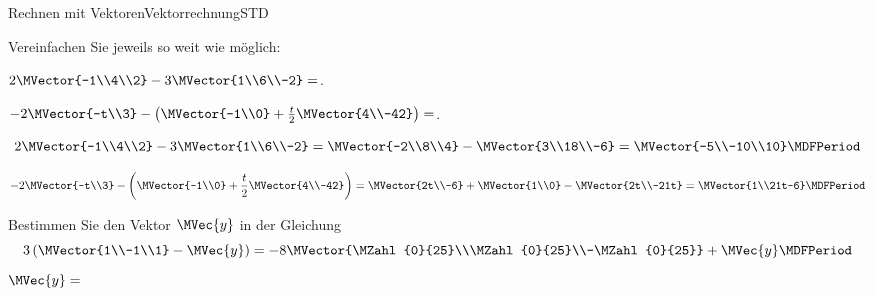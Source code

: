 \begin{MXContent}{Rechnen mit Vektoren}{Vektorrechnung}{STD}
\begin{MExercise}
\end{MExercise}

\begin{MExercise}
Vereinfachen Sie jeweils so weit wie möglich:
\begin{MExerciseItems}
\item{$2\MVector{-1\\4\\2}-3\MVector{1\\6\\-2}=$.} 
\item{$-2\MVector{-t\\3}-\left(\MVector{-1\\0}+\frac{t}{2}\MVector{4\\-42}\right)=$.}
\end{MExerciseItems}
\end{MExercise}

\begin{MHint}{\iSolution}
\begin{MExerciseItems}
\item{
\[
 2\MVector{-1\\4\\2}-3\MVector{1\\6\\-2}=\MVector{-2\\8\\4}-\MVector{3\\18\\-6}=\MVector{-5\\-10\\10} \MDFPeriod
\]
} 
\item{
\[
 -2\MVector{-t\\3}-\left(\MVector{-1\\0}+\frac{t}{2}\MVector{4\\-42}\right)=\MVector{2t\\-6}+\MVector{1\\0}-\MVector{2t\\-21t}=\MVector{1\\21t-6} \MDFPeriod
\]

}
\end{MExerciseItems}
 
\end{MHint}

\begin{MExercise}
Bestimmen Sie den Vektor $\MVec{y}$ in der Gleichung
\[
 3\left(\MVector{1\\-1\\1}-\MVec{y}\right)=-8\MVector{\MZahl{0}{25}\\\MZahl{0}{25}\\-\MZahl{0}{25}}+\MVec{y} \MDFPeriod
\]
$\MVec{y}=$
\end{MExercise}


\end{MXContent}
